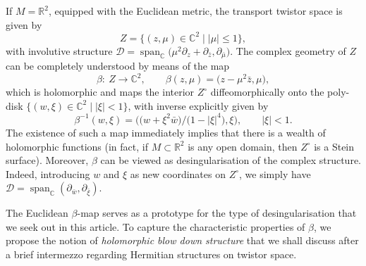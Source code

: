 \documentclass[pdftex]{sigma}
\numberwithin{equation}{section}
\theoremstyle{definition}
\newcommand{\R}{\mathbb{R}} %
\newcommand{\C}{\mathbb{C}} %
\newcommand{\1}{{\bf 1}}
\newcommand{\D}{\mathscr{D}}
\DeclareMathOperator{\spn}{span}
\begin{document}
If $M=\R^2$, equipped with the Euclidean metric, the transport twistor space is given by
\[
Z=\bigl\{(z,\mu)\in \C^2\mid |\mu|\le 1\bigr\},\]
 with involutive structure $\D =\spn_\C\bigl(\mu^2\partial_z+\partial_{\bar z},\partial_{\bar\mu}\bigr)$.
The complex geometry of $Z$ can be completely understood by means of the map
\begin{equation}\label{euclidbeta}
	\beta\colon \ Z\rightarrow \C^2,\qquad \beta(z,\mu)=\bigl(z-\mu^2\bar z,\mu\bigr),
\end{equation}
which is holomorphic and maps the interior $Z^\circ$ diffeomorphically onto the poly-disk $\big\{(w,\xi)\in\C^2\mid |\xi|<1\big\}$, with inverse explicitly given by \[%
\beta^{-1}(w,\xi)=\bigl(\bigl(w+\xi^2\bar w \bigr)/\bigl(1-|\xi|^4\bigr),\xi\bigr),\qquad |\xi|<1.
\]
The existence of such a map immediately implies that there is a wealth of holomorphic functions (in fact, if $M\subset \R^2$ is any open domain, then $Z^\circ$ is a Stein surface). Moreover, $\beta$ can be viewed as desingularisation of the complex structure. Indeed, introducing $w$ and $\xi$ as new coordinates on $Z^\circ$, we simply have $\D=\spn_\C(\partial_{\bar w},\partial_{\bar \xi})$.

The Euclidean $\beta$-map serves as a prototype for the type of desingularisation that we seek out in this article. To capture the characteristic properties of $\beta$, we propose the notion of {\it holomorphic blow down structure} that we shall discuss after a brief intermezzo regarding Hermitian structures on twistor space.
\end{document}
